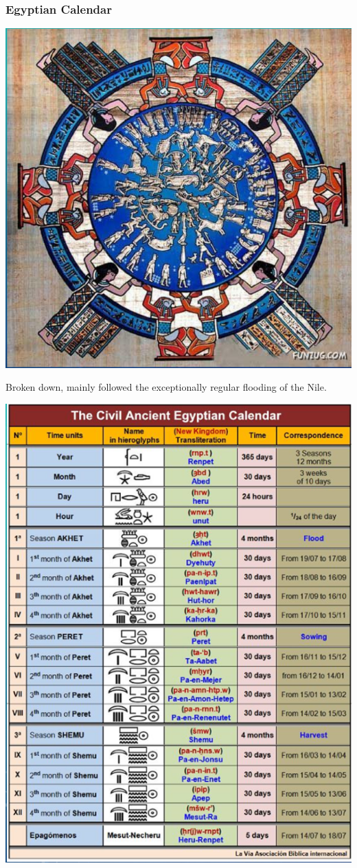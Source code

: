 \documentclass[11pt]{article}
\begin{document}
\subsubsection{Egyptian Calendar}
\label{sec-4-3-3}
\includegraphics[width=.9\linewidth]{./img/egyptcal.png}

Broken down, mainly followed the exceptionally regular flooding of the Nile.

\includegraphics[width=.9\linewidth]{img/egyptcalCivil.png}
\end{document}
